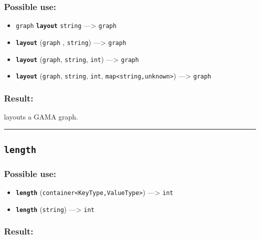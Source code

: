 \documentclass[]{book}
\providecommand{\tightlist}{%
  \setlength{\itemsep}{0pt}\setlength{\parskip}{0pt}}
\theoremstyle{definition}
\theoremstyle{definition}
\theoremstyle{definition}
\theoremstyle{remark}
\begin{document}
\subsubsection{Possible use:}\label{possible-use-319}

\begin{itemize}
\tightlist
\item
  \texttt{graph} \textbf{\texttt{layout}} \texttt{string}
  ---\textgreater{} \texttt{graph}
\item
  \textbf{\texttt{layout}} (\texttt{graph} , \texttt{string})
  ---\textgreater{} \texttt{graph}
\item
  \textbf{\texttt{layout}} (\texttt{graph}, \texttt{string},
  \texttt{int}) ---\textgreater{} \texttt{graph}
\item
  \textbf{\texttt{layout}} (\texttt{graph}, \texttt{string},
  \texttt{int}, \texttt{map\textless{}string,unknown\textgreater{}})
  ---\textgreater{} \texttt{graph}
\end{itemize}

\subsubsection{Result:}\label{result-309}

layouts a GAMA graph.

\begin{center}\rule{0.5\linewidth}{\linethickness}\end{center}

\subsection{\texorpdfstring{\texttt{length}}{length}}\label{length}

\subsubsection{Possible use:}\label{possible-use-320}

\begin{itemize}
\tightlist
\item
  \textbf{\texttt{length}}
  (\texttt{container\textless{}KeyType,ValueType\textgreater{}})
  ---\textgreater{} \texttt{int}
\item
  \textbf{\texttt{length}} (\texttt{string}) ---\textgreater{}
  \texttt{int}
\end{itemize}

\subsubsection{Result:}\label{result-310}
\end{document}
